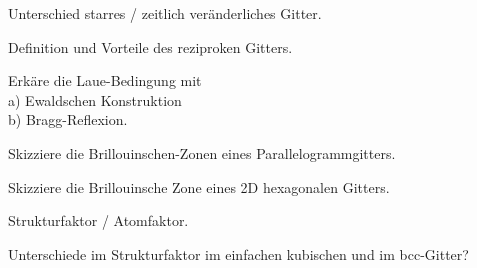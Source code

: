 \documentclass[a5paper,12pt,ngerman,grid=front %
,print
]{kartei}
\begin{document}
	\begin{karte}{
		Unterschied starres / zeitlich veränderliches Gitter.
		}
		
		
		
	\end{karte}


	\begin{karte}{
		Definition und Vorteile des reziproken Gitters.
		}
		
		
		
	\end{karte}


	\begin{karte}{
		Erkäre die Laue-Bedingung mit \\
		a) Ewaldschen Konstruktion \\
		b) Bragg-Reflexion.
		}
		
		
		
	\end{karte}


	\begin{karte}{
		Skizziere die Brillouinschen-Zonen eines Parallelogrammgitters.
		}
		
		
		
	\end{karte}


	\begin{karte}{
		Skizziere die Brillouinsche Zone eines 2D hexagonalen Gitters.
		}
		
		
		
	\end{karte}


	\begin{karte}{
		Strukturfaktor / Atomfaktor.
		}
		
		
		
	\end{karte}


	\begin{karte}{
		Unterschiede im Strukturfaktor im einfachen kubischen und im bcc-Gitter?
		}
		
		
		
	\end{karte}
\end{document}

